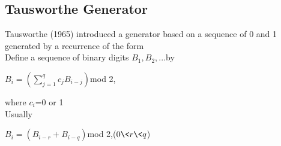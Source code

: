 \documentclass[a4paper,11pt]{article}
\begin{document}
{{}

\subsection{Tausworthe Generator}
{Tausworthe (1965) introduced a generator based on a sequence of 0 and 1 generated by a recurrence of the form\\
Define a sequence of binary digits $B_1,B_2,...$by\\
\begin{center}
$B_i=(\sum_{j=1}^qc_jB_{i-j})$mod 2,\\
\end{center}
where $c_i$=0 or 1\\
Usually \\
\begin{center}
$B_i=(B_{i-r}+B_{i-q})$mod 2,($0\<r\<q$)\\
\end{center}
}



}
 
\end{document}
